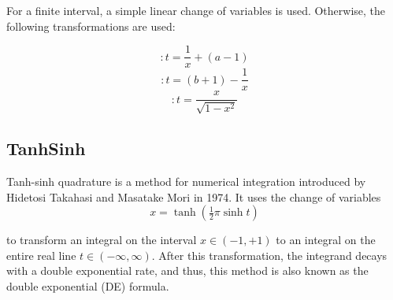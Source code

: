 %
%
%
%
%
%
%
%
%
%
%
%


For a finite interval, a simple linear change of variables is used. Otherwise, the following transformations are used:

\begin{equation}
[a,\infty] : t=\frac{1}{x} + (a-1)
\end{equation}
\begin{equation}
[-\infty,b] : t= (b+1) -\frac{1}{x} 
\end{equation}
\begin{equation}
[-\infty,\infty] : t=\frac{x}{\sqrt{1-x^2}} 
\end{equation}


\subsection{TanhSinh}
\label{DoubleExponentialTransformation}

Tanh-sinh quadrature is a method for numerical integration introduced by Hidetosi Takahasi and Masatake Mori in 1974. It uses the change of variables
\begin{equation}
x = \tanh \left(\tfrac{1}{2} \pi \sinh t \right)
\end{equation}

to transform an integral on the interval $x \in (−1, +1)$ to an integral on the entire real line $t ∈ (-\infty,\infty)$. After this transformation, the integrand decays with a double exponential rate, and thus, this method is also known as the double exponential (DE) formula.

